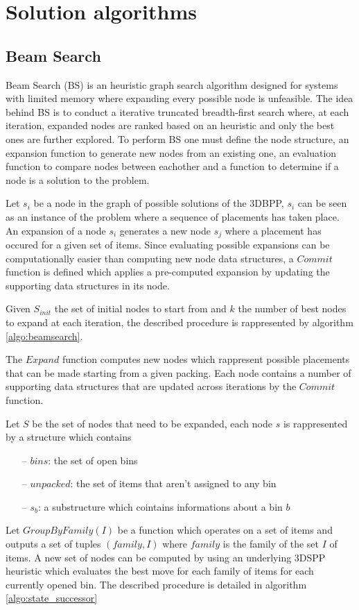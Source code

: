 \chapter{Solution algorithms}\label{chapter:heuristics}
\section{Beam Search}\label{chapter:heuristics:beamsearch}
Beam Search (BS) %
is an heuristic graph search algorithm designed for systems with limited memory where expanding every possible node is unfeasible.
The idea behind BS is to conduct a iterative truncated breadth-first search where, at each iteration, expanded nodes are ranked based on an heuristic and only the best ones are further explored.
To perform BS one must define the node structure, an expansion function to generate new nodes from an existing one, an evaluation function to compare nodes between eachother and a function to determine if a node is a solution to the problem.

Let $s_i$ be a node in the graph of possible solutions of the 3DBPP,
$s_i$ can be seen as an instance of the problem where a sequence of placements has taken place.
An expansion of a node $s_i$ generates a new node $s_j$ where a placement has occured for a given set of items.
Since evaluating possible expansions can be computationally easier than computing new node data structures, %
a $Commit$ function is defined which applies a pre-computed expansion by updating the supporting data structures in its node.

Given $S_{init}$ the set of initial nodes to start from and $k$ the number of best nodes to expand at each iteration, the described procedure is rappresented by algorithm \ref{algo:beamsearch}.



The $Expand$ function computes new nodes which rappresent possible placements that can be made starting from a given packing.
Each node contains a number of supporting data structures that are updated across iterations by the $Commit$ function.

Let $S$ be the set of nodes that need to be expanded, each node $s$ is rappresented by a structure which contains
\begin{itemize}
    \item[--] $bins$: the set of open bins
    \item[--] $unpacked$: the set of items that aren't assigned to any bin
    \item[--] $s_b$: a substructure which cointains informations about a bin $b$
\end{itemize}
Let $GroupByFamily(I)$ be a function which operates on a set of items and outputs a set of tuples $(family, I)$ where $family$ is the family of the set $I$ of items. %
A new set of nodes can be computed by using an underlying 3DSPP heuristic which evaluates the best move for each family of items for each currently opened bin.
The described procedure is detailed in algorithm \ref{algo:state_successor}  

